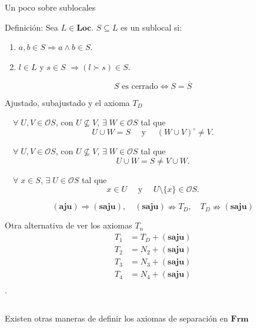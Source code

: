 \documentclass[compress,12pt]{beamer}
\begin{document}
\begin{frame}{Un poco sobre sublocales}
    \begin{block}{Definición:}
        Sea $L\in \mathbf{Loc}$. $S\subseteq L$ es un sublocal si:
        \begin{enumerate}
            \item $a, b\in S \Rightarrow a\wedge b\in S$.
            \item $l\in L$ y $s\in S$ $\Rightarrow (l\succ s)\in S$.
        \end{enumerate}
    \end{block}

    \[
    S\mbox{ es cerrado}\Leftrightarrow S=\overline{S}
    \]
\end{frame}

\begin{frame}{Ajustado, subajustado y el axioma $T_D$}
\begin{description}
    \item[$\mathbf{(aju)}$] $\quad\forall\; U, V\in \mathcal{O}S$, con $U\nsubseteq V$, $\exists\; W\in \mathcal{O}S$ tal que 
    \[
    U\cup W=S\quad \mbox{ y }\quad (W\cup V)^\circ\neq V.
    \]
    \item<2->[$\mathbf{(saju)}$] $\quad\forall\; U, V\in \mathcal{O}S$, con $U\nsubseteq V$, $\exists\; W\in \mathcal{O}S$ tal que 
    \[
    U\cup W=S\neq V\cup W.
    \]
    \item<3->[$T_D$] $\quad\forall\; x\in S$, $\exists\; U\in \mathcal{O}S$ tal que 
    \[
    x\in U\quad \mbox{ y } \quad U\setminus \{x\}\in \mathcal{O}S.
    \]
\end{description}
\[
    \mathbf{(aju)}\Rightarrow \mathbf{(saju)},\quad \mathbf{(saju)}\nRightarrow T_D,\quad T_D\nRightarrow \mathbf{(saju)}
    \]
\end{frame}

\begin{frame}{Otra alternativa de ver los axiomas $T_n$}
    \[
    \begin{split}
        T_1&= T_D+\mathbf{(saju)}\\
        T_2&= N_2+\mathbf{(saju)}\\
        T_3&= N_3+\mathbf{(saju)}\\
        T_4&= N_4+\mathbf{(saju)}\\
    \end{split}
    \]
    .\\
    \begin{tiny}
$$\mbox{ }$$
\end{tiny}

    \alert{Existen otras maneras de definir los axiomas de separación en $\mathbf{Frm}$}
\end{frame}
\end{document}
